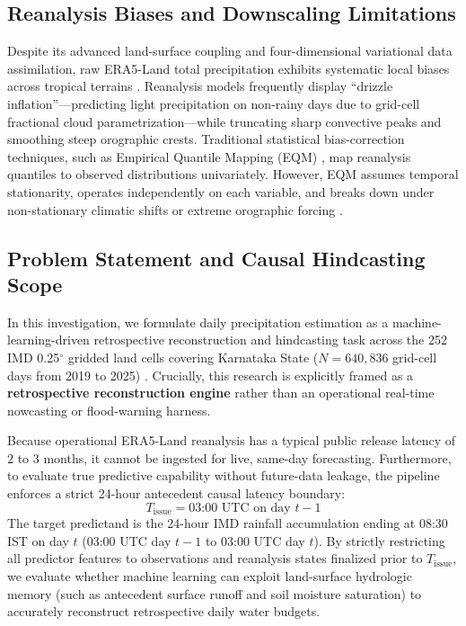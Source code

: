 \documentclass[12pt]{article}
\begin{document}
\subsection{Reanalysis Biases and Downscaling Limitations}
Despite its advanced land-surface coupling and four-dimensional variational data assimilation, raw ERA5-Land total precipitation exhibits systematic local biases across tropical terrains \cite{goswami2006}. Reanalysis models frequently display ``drizzle inflation''---predicting light precipitation on non-rainy days due to grid-cell fractional cloud parametrization---while truncating sharp convective peaks and smoothing steep orographic crests. Traditional statistical bias-correction techniques, such as Empirical Quantile Mapping (EQM) \cite{piani2011}, map reanalysis quantiles to observed distributions univariately. However, EQM assumes temporal stationarity, operates independently on each variable, and breaks down under non-stationary climatic shifts or extreme orographic forcing \cite{cannon2015}.

\subsection{Problem Statement and Causal Hindcasting Scope}
In this investigation, we formulate daily precipitation estimation as a machine-learning-driven retrospective reconstruction and hindcasting task across the 252 IMD 0.25$^\circ$ gridded land cells covering Karnataka State ($N = 640,836$ grid-cell days from 2019 to 2025) \cite{bano2020, reichstein2019}. Crucially, this research is explicitly framed as a \textbf{retrospective reconstruction engine} rather than an operational real-time nowcasting or flood-warning harness. 

Because operational ERA5-Land reanalysis has a typical public release latency of 2 to 3 months, it cannot be ingested for live, same-day forecasting. Furthermore, to evaluate true predictive capability without future-data leakage, the pipeline enforces a strict 24-hour antecedent causal latency boundary:
\begin{equation}
T_{\text{issue}} = \text{03:00 UTC on day } t-1
\end{equation}
The target predictand is the 24-hour IMD rainfall accumulation ending at 08:30 IST on day $t$ (03:00 UTC day $t-1$ to 03:00 UTC day $t$). By strictly restricting all predictor features to observations and reanalysis states finalized prior to $T_{\text{issue}}$, we evaluate whether machine learning can exploit land-surface hydrologic memory (such as antecedent surface runoff and soil moisture saturation) to accurately reconstruct retrospective daily water budgets.
\end{document}
